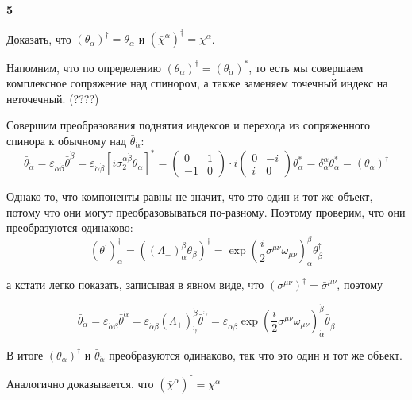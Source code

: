 \documentclass[a4paper,12pt]{article} %
\begin{document}
\begin{task}\textbf{5}

Доказать, что	
$\left(\theta_{\alpha}\right)^{\dagger}=\bar{\theta}_{\dot{\alpha}}$ 
и 
$\left(\bar{\chi}^{\dot{\alpha}}\right)^{\dagger}=\chi^{\alpha}$.

Напомним, что по определению $ \left(\theta_{\alpha}\right)^{\dagger}=\left(\theta_{\dot{\alpha}}\right)^{*}$, 
то есть мы совершаем комплексное сопряжение над спинором, а также заменяем точечный индекс на неточечный.
(????)

Совершим преобразования поднятия индексов и перехода из сопряженного спинора к обычному над $\bar{\theta}_{\dot{\alpha}}$:
\[ \bar{\theta}_{\dot{\alpha}}=\varepsilon_{\dot{\alpha}\dot{\beta}}\bar{\theta}^{\dot{\beta}}= 
\varepsilon_{\dot{\alpha}\dot{\beta}}[i\sigma_2^{\alpha\dot{\beta}} \theta_\alpha]^{*}=
\left(\begin{array}{cc}
	{0} & {1} \\ {-1} & {0}
\end{array}\right) \cdot i
\left(\begin{array}{cc}
	{0} & {-i} \\ {i} & {0}
\end{array}\right)\theta_\alpha^{*}=
\delta_{\dot{\alpha}}^{\alpha}\theta_\alpha^{*}= (\theta_\alpha)^{\dagger}
\]

Однако то, что компоненты равны не значит, что это один и тот же объект, потому что они могут преобразовываться по-разному.
Поэтому проверим, что они преобразуются одинаково:
\[ (\theta^\prime)^\dagger_\alpha=
((\Lambda_{-})^\beta_\alpha \theta_\beta)^\dagger=
\exp \left(\frac{i}{2}\sigma^{\mu\nu}\omega_{\mu\nu}\right)^\beta_\alpha \theta_\beta^\dagger \]


а кстати легко показать, записывая в явном виде, что 
$(\sigma^{\mu\nu})^\dagger=\bar{\sigma}^{\mu\nu} $, поэтому

\[ 
\bar{\theta}_{\dot{\alpha}}
=
\varepsilon_{\dot{\alpha}\dot{\beta}}\bar{\theta}^{\dot{\alpha}} 
=
\varepsilon_{\dot{\alpha}\dot{\beta}}(\Lambda_{+})_\dot{\gamma}^\dot{\beta}\bar{\theta}^{\dot{\gamma}}
=
\varepsilon_{\dot{\alpha}\dot{\beta}}
\exp \left(\frac{i}{2}\sigma^{\mu\nu}\omega_{\mu\nu}\right)^\dot{\beta}_\dot{\alpha}
\bar{\theta}_{\dot{\beta}}
\]


В итоге $\left(\theta_{\alpha}\right)^{\dagger}$ и $\bar{\theta}_{\dot{\alpha}}$ преобразуются одинаково, так что это один и тот же объект.



Аналогично доказывается, что  $\left(\bar{\chi}^{\dot{\alpha}}\right)^{\dagger}=\chi^{\alpha}$



























\end{task}
\end{document}
